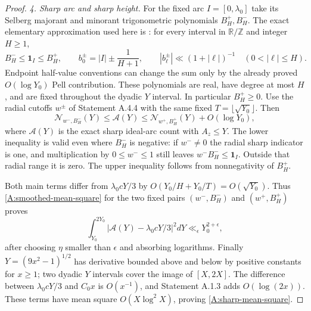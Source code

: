 \begin{proof}
\emph{4. Sharp arc and sharp height.}
For the fixed arc $I=[0,\lambda_0]$ take its Selberg majorant
and minorant trigonometric polynomials $B_H^+,B_H^-$.
The exact elementary approximation used here is
\cite[equation (4.11)]{LesterMatomakiRadziwill2015}:
for every interval in $\mathbb R/\mathbb Z$ and integer $H\geq1$,
\[
 B_H^-\leq\mathbf1_I\leq B_H^+,\qquad
 b_0^\pm=|I|\pm\frac1{H+1},\qquad
 |b_\ell^\pm|\ll(1+|\ell|)^{-1}\quad(0<|\ell|\leq H).
\]
Endpoint half-value conventions can change the sum only by the
already proved $O(\log Y_0)$ Pell contribution.
These polynomials are real, have degree at most $H$, and are
fixed throughout the dyadic $Y$ interval. In particular $B_H^+\geq0$.
Use the radial cutoffs $w^\pm$ of Statement A.4.4 with the same
fixed $T=\lfloor\sqrt{Y_0}\rfloor$. Then
\[
 \mathcal N_{w^-,B_H^-}(Y)
 \leq\mathcal A(Y)
 \leq\mathcal N_{w^+,B_H^+}(Y)+O(\log Y_0),
\]
where $\mathcal A(Y)$ is the exact sharp ideal-arc count with
$A_z\leq Y$. The lower inequality is valid even where
$B_H^-$ is negative: if $w^-\ne0$ the radial sharp indicator
is one, and multiplication by $0\leq w^-\leq1$ still leaves
$w^-B_H^-\leq\mathbf1_I$. Outside that radial range it is zero.
The upper inequality follows from nonnegativity of $B_H^+$.

Both main terms differ from $\lambda_0cY/3$ by
$O(Y_0/H+Y_0/T)=O(\sqrt{Y_0})$.
Thus \eqref{A:smoothed-mean-square} for the two fixed pairs
$(w^-,B_H^-)$ and $(w^+,B_H^+)$ proves
\[
 \int_{Y_0}^{2Y_0}|\mathcal A(Y)-\lambda_0cY/3|^2dY
       \ll_\epsilon Y_0^{2+\epsilon},
\]
after choosing $\eta$ smaller than $\epsilon$ and absorbing
logarithms. Finally $Y=(9x^2-1)^{1/2}$ has derivative bounded
above and below by positive constants for $x\geq1$;
two dyadic $Y$ intervals cover the image of $[X,2X]$.
The difference between $\lambda_0cY/3$ and $C_0x$ is
$O(x^{-1})$, and Statement A.1.3 adds $O(\log(2x))$.
These terms have mean square $O(X\log^2X)$, proving
\eqref{A:sharp-mean-square}.
\end{proof}
